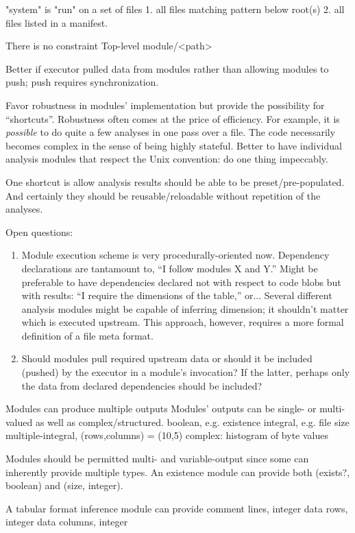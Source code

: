 \documentclass {article}
\begin{document}
"system" is "run" on a set of files
	1. all files matching pattern below root(s)
	2. all files listed in a manifest.

There is no constraint
Top-level
	module/<path>

Better if executor pulled data from modules rather than allowing
modules to push; push requires synchronization.

Favor robustness in modules' implementation but provide the possibility
for ``shortcuts''. Robustness often comes at the price of efficiency.
For example, it is \emph{possible} to do quite a few analyses in one
pass over a file. The code necessarily becomes complex in the sense of
being highly stateful. Better to have individual analysis modules that
respect the Unix convention: do one thing impeccably.

One shortcut is allow analysis results should be able to be preset/pre-populated.
And certainly they should be reusable/reloadable without repetition of the
analyses.

Open questions:
\begin{enumerate}
\item Module execution scheme is very procedurally-oriented now. Dependency
	declarations are tantamount to, ``I follow modules X and Y.'' Might
	be preferable to have dependencies declared not with respect to code
	blobs but with results: ``I require the dimensions of the table,'' or...
	Several different analysis modules might be capable of inferring
	dimension; it shouldn't matter which is executed upstream. This
	approach, however, requires a more formal definition of a file meta
	format.
\item Should modules pull required upstream data or should it be
	included (pushed) by the executor in a module's invocation?
	If the latter, perhaps only the data from declared dependencies
	should be included?
\end{enumerate}

Modules can produce multiple outputs
Modules' outputs can be single- or multi-valued as well as
	complex/structured.
	boolean, e.g. existence
	integral, e.g. file size
	multiple-integral, (rows,columns) = (10,5)
	complex: histogram of byte values

Modules should be permitted multi- and variable-output since some can 
inherently provide multiple types. An existence module can provide
both (exists?, boolean) and (size, integer).

A tabular format inference module can provide
comment lines, integer
data rows, integer
data columns, integer
\end{document}
